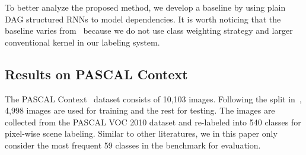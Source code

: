 \documentclass[10pt,twocolumn,letterpaper]{article}
\begin{document}
 To better analyze the proposed method, we develop a baseline by using plain DAG structured RNNs to model dependencies. It is worth noticing that the baseline varies from~\cite{shuai2017scene} because we do not use class weighting strategy and larger conventional kernel in our labeling system.

\subsection{Results on PASCAL Context}

The PASCAL Context~\cite{mottaghi2014role} dataset consists of 10,103 images. Following the split in~\cite{mottaghi2014role}, 4,998 images are used for training and the rest for testing. The images are collected from the PASCAL VOC 2010 dataset and re-labeled into 540 classes for pixel-wise scene labeling. Similar to other literatures, we in this paper only consider the most frequent 59 classes in the benchmark for evaluation.
\end{document}
